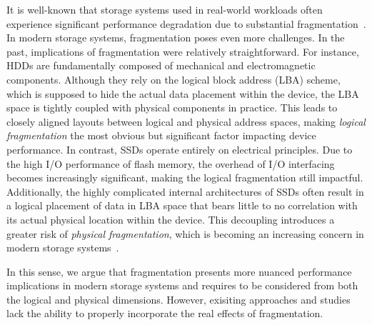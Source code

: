 

%
%
%

It is well-known that storage systems used in real-world workloads often experience significant performance degradation due to substantial fragmentation~\cite{NEEDED}.
In modern storage systems, fragmentation poses even more challenges.
%
In the past, implications of fragmentation were relatively straightforward.
For instance, HDDs are fundamentally composed of mechanical and electromagnetic components.
Although they rely on the logical block address (LBA) scheme, which is supposed to hide the actual data placement within the device, the LBA space is tightly coupled with physical components in practice.
This leads to closely aligned layouts between logical and physical address spaces, making \emph{logical fragmentation} the most obvious but significant factor impacting device performance.
In contrast, SSDs operate entirely on electrical principles.
Due to the high I/O performance of flash memory, the overhead of I/O interfacing becomes increasingly significant, making the logical fragmentation still impactful.
Additionally, the highly complicated internal architectures of SSDs often result in a logical placement of data in LBA space that bears little to no correlation with its actual physical location within the device.
This decoupling introduces a greater risk of \emph{physical fragmentation}, which is becoming an increasing concern in modern storage systems~\cite{NEEDED,NEEDED}.


In this sense, we argue that fragmentation presents more nuanced performance implications in modern storage systems and requires to be considered from both the logical and physical dimensions.
However, exisiting approaches and studies lack the ability to properly incorporate the real effects of fragmentation.

